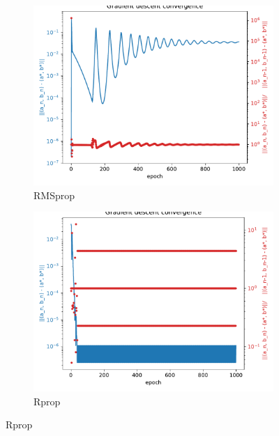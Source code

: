 \documentclass[12pt]{article}
\begin{document}
\begin{figure}[htbp]
\begin{subfigure}[t]{0.48\textwidth}
        \includegraphics[width=\textwidth]{Homework1/ex2x5.pdf}
        \caption{RMSprop}
    \end{subfigure}
    \begin{subfigure}[t]{0.48\textwidth}
        \centering
        \includegraphics[width=\textwidth]{Homework1/ex2x6.pdf}
        \caption{Rprop}
    \end{subfigure}
\end{figure}
\inputminted[]{python}{./Homework1/ex2.py}
\end{document}
